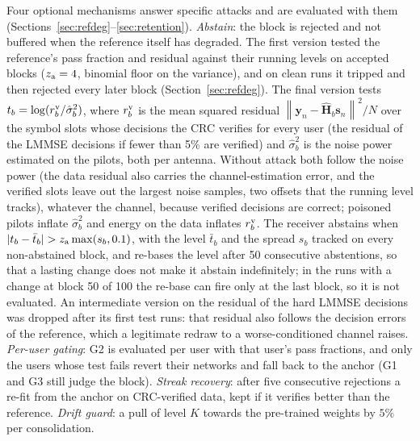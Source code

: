 \documentclass[journal]{IEEEtran}
\theoremstyle{remark}
\newcommand{\norm}[1]{\left\lVert #1 \right\rVert}
\begin{document}
Four optional mechanisms answer specific attacks and are evaluated
with them (Sections~\ref{sec:refdeg}--\ref{sec:retention}). \emph{Abstain}: the block is rejected
and not buffered when the reference itself has degraded. The first version tested the reference's
pass fraction and residual against their running levels on accepted blocks ($z_{\rm a}=4$, binomial floor
on the variance), and on clean runs it tripped and then rejected every later block (Section~\ref{sec:refdeg}). The final version tests
$t_b=\log(r^{\rm v}_b/\hat\sigma^2_b)$, where $r^{\rm v}_b$ is the mean squared residual
$\norm{\bm y_n-\hat{\bm H}_b\bm s_n}^2/N$ over the symbol slots whose decisions the CRC verifies for every
user (the residual of the LMMSE decisions if fewer than 5\% are verified) and $\hat\sigma^2_b$ is the
noise power estimated on the pilots, both per antenna. Without attack both follow the noise power (the data residual also carries the channel-estimation error, and the verified slots leave out the largest noise samples, two offsets that the running level tracks), whatever the
channel, because verified decisions are correct; poisoned pilots inflate $\hat\sigma^2_b$ and energy
on the data inflates $r^{\rm v}_b$. The receiver abstains when $|t_b-\bar t_b|>z_{\rm a}\max(s_b,0.1)$,
with the level $\bar t_b$ and the spread $s_b$ tracked on every non-abstained block, and re-bases the
level after 50 consecutive abstentions, so that a lasting change does not make it abstain indefinitely; in the runs
with a change at block 50 of 100 the re-base can fire only at the last block, so it is not evaluated. An intermediate
version on the residual of the hard LMMSE decisions was dropped after its first test runs: that
residual also follows the decision errors of the reference, which a legitimate redraw to a
worse-conditioned channel raises. \emph{Per-user gating}: G2 is evaluated per user with that user's
pass fractions, and only the users whose test fails revert their networks and fall back to the
anchor (G1 and G3 still judge the block). \emph{Streak recovery}: after five consecutive rejections
a re-fit from the anchor on CRC-verified data, kept if it verifies better than the reference.
\emph{Drift guard}: a pull of level $K$ towards the pre-trained weights by $5\%$ per consolidation.
\end{document}
